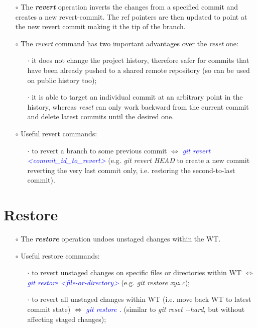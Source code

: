 \documentclass[a4paper,portrait,10pt]{article}   %
\newcommand{\mybulletlvA}{$\circ$}   %
\newcommand{\mybulletlvB}{$\cdot$}   %
\newcommand{\mydiv}{$\Leftrightarrow$ }   %
\newcommand{\mycmd}[1]{\textcolor{blue}{\textit{#1}}}   %
\newcommand{\myvspace}{\vspace{4mm}}   %
\begin{document}
\begin{itemize}
\item[\mybulletlvA] The \textbf{\textit{revert}} operation inverts the changes from a specified commit and creates a new revert-commit. The ref pointers are then updated to point at the new revert commit making it the tip of the branch.
\myvspace

\item[\mybulletlvA] The \textit{revert} command has two important advantages over the \textit{reset} one:
\begin{itemize}
  \item[\mybulletlvB] it does not change the project history, therefore safer for commits that have been already pushed to a shared remote repository (so can be used on public history too);
  \item[\mybulletlvB] it is able to target an individual commit at an arbitrary point in the history, whereas \textit{reset} can only work backward from the current commit and delete latest commits until the desired one.
\end{itemize}
\myvspace

\item[\mybulletlvA] Useful revert commands:
\begin{itemize}
  \item[\mybulletlvB] to revert a branch to some previous commit \mydiv \mycmd{git revert <commit\_id\_to\_revert>} (e.g. \textit{git revert HEAD} to create a new commit reverting the very last commit only, i.e. restoring the second-to-last commit).
\end{itemize}
\end{itemize}
\myvspace


\section{Restore}   \label{sec:Restore}

\begin{itemize}
\item[\mybulletlvA] The \textbf{\textit{restore}} operation undoes unstaged changes within the WT.
\myvspace

\item[\mybulletlvA] Useful restore commands:
\begin{itemize}
  \item[\mybulletlvB] to revert unstaged changes on specific files or directories within WT \mydiv \mycmd{git restore <file-or-directory>} (e.g. \textit{git restore xyz.c});
  \item[\mybulletlvB] to revert all unstaged changes within WT (i.e. move back WT to latest commit state) \mydiv \mycmd{git restore .} (similar to \textit{git reset -{}-hard}, but without affecting staged changes);
\end{itemize}
\end{itemize}
\myvspace
\end{document}

